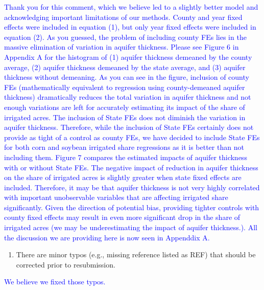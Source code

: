 \documentclass[
]{article}
\providecommand{\tightlist}{%
  \setlength{\itemsep}{0pt}\setlength{\parskip}{0pt}}
\begin{document}
\textcolor{blue}{Thank you for this comment, which we believe led to a slightly better model and acknowledging important limitations of our methods. County and year fixed effects were included in equation (1), but only year fixed effects were included in equation (2). As you guessed, the problem of including county FEs lies in the massive elimination of variation in aquifer thickness. Please see Figure 6 in Appendix A for the histogram of (1) aquifer thickness demeaned by the county average, (2) aquifer thickness demeaned by the state average, and (3) aquifer thickness without demeaning. As you can see in the figure, inclusion of county FEs (mathematically equivalent to regression using county-demeaned aquifer thickness) dramatically reduces the total variation in aquifer thickness and not enough variations are left for accurately estimating its impact of the share of irrigated acres. The inclusion of State FEs does not diminish the variation in aquifer thickness. Therefore, while the inclusion of State FEs certainly does not provide as tight of a control as county FEs, we have decided to include State FEs for both corn and soybean irrigated share regressions as it is better than not including them. Figure 7 compares the estimated impacts of aquifer thickness with or without State FEs. The negative impact of reduction in aquifer thickness on the share of irrigated acres is slightly greater when state fixed effects are included. Therefore, it may be that aquifer thickness is not very highly correlated with important unobservable variables that are affecting irrigated share significantly. Given the direction of potential bias, providing tighter controls with county fixed effects may result in even more significant drop in the share of irrigated acres (we may be underestimating the impact of aquifer thickness.). All the discussion we are providing here is now seen in Appenddix A.
}

\begin{enumerate}
\def\labelenumi{\arabic{enumi}.}
\setcounter{enumi}{3}
\tightlist
\item
  There are minor typos (e.g., missing reference listed as REF) that
  should be corrected prior to resubmission.
\end{enumerate}

\textcolor{blue}{We believe we fixed those typos.}
\end{document}

